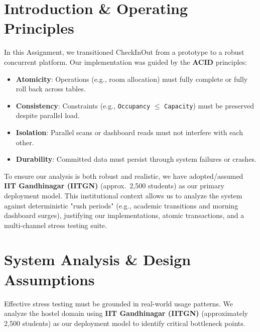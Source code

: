 \documentclass[sigconf]{acmart}
\begin{document}

\maketitle

\section{Introduction \& Operating Principles}


In this Assignment, we transitioned CheckInOut from a prototype to a robust concurrent platform. Our implementation was guided by the \textbf{ACID} principles:
\begin{itemize}[leftmargin=*]
    \item \textbf{Atomicity}: Operations (e.g., room allocation) must fully complete or fully roll back across tables.
    \item \textbf{Consistency}: Constraints (e.g., \texttt{Occupancy} $\leq$ \texttt{Capacity}) must be preserved despite parallel load.
    \item \textbf{Isolation}: Parallel scans or dashboard reads must not interfere with each other.
    \item \textbf{Durability}: Committed data must persist through system failures or crashes.
\end{itemize}

To ensure our analysis is both robust and realistic, we have adopted/assumed \textbf{IIT Gandhinagar (IITGN)} (approx.\ 2,500 students) as our primary deployment model. This institutional context allows us to analyze the system against deterministic "rush periods" (e.g., academic transitions and morning dashboard surges), justifying our implementations, atomic transactions, and a multi-channel stress testing suite.

\section{System Analysis \& Design Assumptions}

Effective stress testing must be grounded in real-world usage patterns. We analyze the hostel domain using \textbf{IIT Gandhinagar (IITGN)} (approximately 2,500 students) as our deployment model to identify critical bottleneck points.
\end{document}
